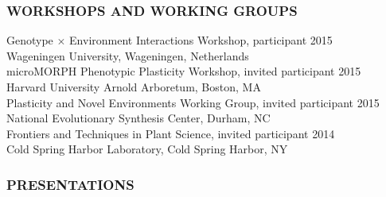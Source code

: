 \documentclass[12pt,english]{article}
\begin{document}
\subsubsection*{WORKSHOPS AND WORKING GROUPS}
\vspace{-0.5ex}
\hspace*{1.0em} Genotype $\times$ Environment Interactions Workshop, participant
\hfill 
2015\\
\hspace*{2.0em}  Wageningen University, Wageningen, Netherlands
\vspace{1ex}\\
\hspace*{1.0em} microMORPH Phenotypic Plasticity Workshop, invited participant
\hfill 
2015\\
\hspace*{2.0em}  Harvard University Arnold Arboretum, Boston, MA
\vspace{1ex}\\
\hspace*{1.0em} Plasticity and Novel Environments Working Group, invited participant
\hfill 
2015\\
\hspace*{2.0em}  National Evolutionary Synthesis Center, Durham, NC
\vspace{1ex}\\
\hspace*{1.0em} Frontiers and Techniques in Plant Science, invited participant
\hfill 
2014\\
\hspace*{2.0em}  Cold Spring Harbor Laboratory, Cold Spring Harbor, NY
\vspace{1ex}


\subsubsection*{PRESENTATIONS}
\vspace{-0.5ex}
\end{document}
